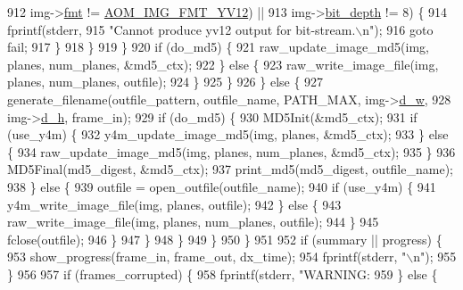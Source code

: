 \begin{DoxyCodeInclude}
{{{{{{{{{{{{{{{{{{{{{{{{{{{{{{{{{{{{{{{{{{{{{{{912                      img->\hyperlink{structaom__image_a6c64b1ab918d80d52eb8f5d6d957e825}{fmt} != \hyperlink{aom__image_8h_a930317c04b4bd0a660bb5e744055523cad28244100a2754409f285b77a3db90a0}{AOM\_IMG\_FMT\_YV12}) ||
913                     img->\hyperlink{structaom__image_a46ed9ffd741938d306a0db5a24bdcf8e}{bit\_depth} != 8) \{
914                   fprintf(stderr,
915                           \textcolor{stringliteral}{"Cannot produce yv12 output for bit-stream.\(\backslash\)n"});
916                   \textcolor{keywordflow}{goto} fail;
917                 \}
918               \}
919             \}
920             \textcolor{keywordflow}{if} (do\_md5) \{
921               raw\_update\_image\_md5(img, planes, num\_planes, &md5\_ctx);
922             \} \textcolor{keywordflow}{else} \{
923               raw\_write\_image\_file(img, planes, num\_planes, outfile);
924             \}
925           \}
926         \} \textcolor{keywordflow}{else} \{
927           generate\_filename(outfile\_pattern, outfile\_name, PATH\_MAX, img->\hyperlink{structaom__image_a89f80b1f58d608b9d2080635f4359034}{d\_w},
928                             img->\hyperlink{structaom__image_ab986419a1f0fff93a2dc505f47194988}{d\_h}, frame\_in);
929           \textcolor{keywordflow}{if} (do\_md5) \{
930             MD5Init(&md5\_ctx);
931             \textcolor{keywordflow}{if} (use\_y4m) \{
932               y4m\_update\_image\_md5(img, planes, &md5\_ctx);
933             \} \textcolor{keywordflow}{else} \{
934               raw\_update\_image\_md5(img, planes, num\_planes, &md5\_ctx);
935             \}
936             MD5Final(md5\_digest, &md5\_ctx);
937             print\_md5(md5\_digest, outfile\_name);
938           \} \textcolor{keywordflow}{else} \{
939             outfile = open\_outfile(outfile\_name);
940             \textcolor{keywordflow}{if} (use\_y4m) \{
941               y4m\_write\_image\_file(img, planes, outfile);
942             \} \textcolor{keywordflow}{else} \{
943               raw\_write\_image\_file(img, planes, num\_planes, outfile);
944             \}
945             fclose(outfile);
946           \}
947         \}
948       \}
949     \}
950   \}
951 
952   \textcolor{keywordflow}{if} (summary || progress) \{
953     show\_progress(frame\_in, frame\_out, dx\_time);
954     fprintf(stderr, \textcolor{stringliteral}{"\(\backslash\)n"});
955   \}
956 
957   \textcolor{keywordflow}{if} (frames\_corrupted) \{
958     fprintf(stderr, \textcolor{stringliteral}{"WARNING: %
959   \} \textcolor{keywordflow}{else} \{
}}}}}}}}}}}}}}}}}}}}}}}}}}}}}}}}}}}}}}}}}}}}}}}}
\end{DoxyCodeInclude}
